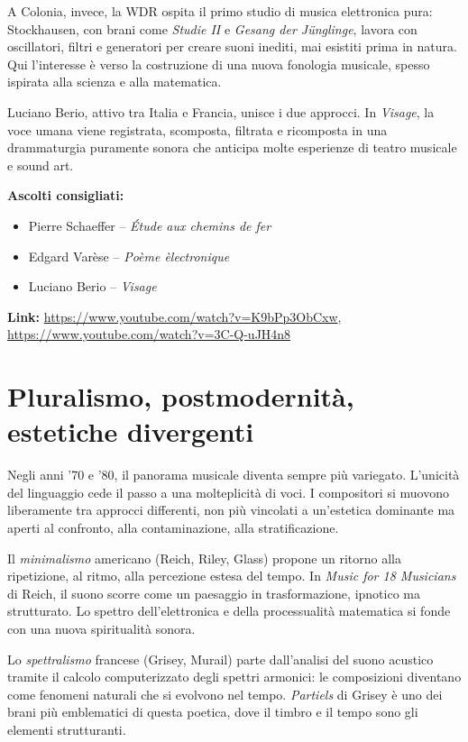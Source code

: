 \documentclass[12pt,a4paper]{article}
\begin{document}
A Colonia, invece, la WDR ospita il primo studio di musica elettronica pura: Stockhausen, con brani come \emph{Studie II} e \emph{Gesang der J\"unglinge}, lavora con oscillatori, filtri e generatori per creare suoni inediti, mai esistiti prima in natura. Qui l’interesse \`e verso la costruzione di una nuova fonologia musicale, spesso ispirata alla scienza e alla matematica.

Luciano Berio, attivo tra Italia e Francia, unisce i due approcci. In \emph{Visage}, la voce umana viene registrata, scomposta, filtrata e ricomposta in una drammaturgia puramente sonora che anticipa molte esperienze di teatro musicale e sound art.

\textbf{Ascolti consigliati:}
\begin{itemize}
  \item Pierre Schaeffer -- \textit{\'Etude aux chemins de fer}
  \item Edgard Var\`ese -- \textit{Po\`eme \`electronique}
  \item Luciano Berio -- \textit{Visage}
\end{itemize}
\textbf{Link:} \url{https://www.youtube.com/watch?v=K9bPp3ObCxw}, \url{https://www.youtube.com/watch?v=3C-Q-uJH4n8}

\section{Pluralismo, postmodernit\`a, estetiche divergenti}
Negli anni ’70 e ’80, il panorama musicale diventa sempre pi\`u variegato. L’unicit\`a del linguaggio cede il passo a una molteplicit\`a di voci. I compositori si muovono liberamente tra approcci differenti, non pi\`u vincolati a un’estetica dominante ma aperti al confronto, alla contaminazione, alla stratificazione.

Il \emph{minimalismo} americano (Reich, Riley, Glass) propone un ritorno alla ripetizione, al ritmo, alla percezione estesa del tempo. In \emph{Music for 18 Musicians} di Reich, il suono scorre come un paesaggio in trasformazione, ipnotico ma strutturato. Lo spettro dell’elettronica e della processualit\`a matematica si fonde con una nuova spiritualit\`a sonora.

Lo \emph{spettralismo} francese (Grisey, Murail) parte dall’analisi del suono acustico tramite il calcolo computerizzato degli spettri armonici: le composizioni diventano come fenomeni naturali che si evolvono nel tempo. \emph{Partiels} di Grisey \`e uno dei brani pi\`u emblematici di questa poetica, dove il timbro e il tempo sono gli elementi strutturanti.
\end{document}
